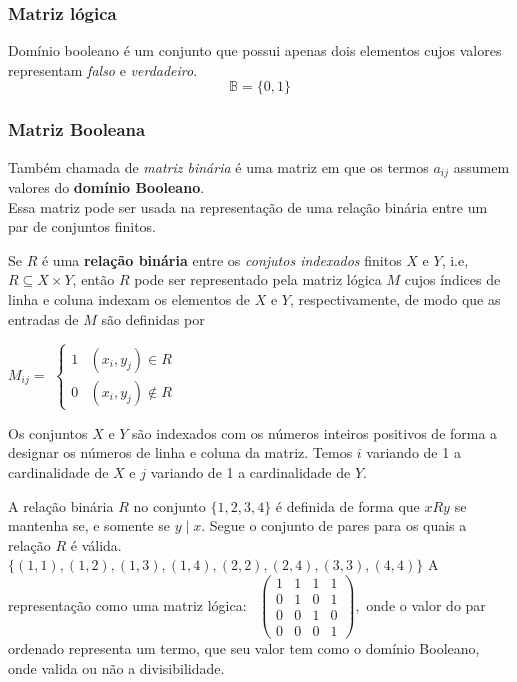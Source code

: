       \subsubsection{Matriz lógica}
         \begin{definition}
            Domínio booleano é um conjunto que possui apenas dois elementos cujos valores representam \textit{falso} e \textit{verdadeiro}.
            $$\mathbb{B} = \{0,1\}$$
         \end{definition}
      
      \subsubsection*{Matriz Booleana}
         Também chamada de \textit{matriz binária} é uma matriz em que os termos $a_{ij}$ assumem valores do \textbf{domínio Booleano}.\\
         Essa matriz pode ser usada na representação de uma relação binária entre um par de conjuntos finitos.
         \begin{definition}
            Se $R$ é uma \textbf{relação binária} entre os \textit{conjutos indexados} finitos $X$ e $Y$, i.e, $R \subseteq X \times Y$, então $R$ pode ser representado pela matriz lógica $M$ cujos índices de linha e coluna indexam os elementos de $X$ e $Y$, respectivamente, de modo que as entradas de $M$ são definidas por
            \begin{center}
               $M_{ij} = $
               $\begin{cases}
                  1 & (x_{i}, y_{j}) \in R \\ 
                  0 & (x_{i}, y_{j}) \notin R
               \end{cases}$
            \end{center}
            Os conjuntos $X$ e $Y$ são indexados com os números inteiros positivos de forma a designar os números de linha e coluna da matriz. Temos $i$ variando de 1 a cardinalidade de $X$ e $j$ variando de 1 a cardinalidade de $Y$.
         \end{definition}
         \begin{exmp}
            A relação binária $R$ no conjunto $\{1,2,3,4\}$ é definida de forma que $xRy$ se mantenha se, e somente se $y \mid x$. Segue o conjunto de pares para os quais a relação $R$ é válida.
            $\{(1,1),(1,2),(1,3),(1,4),(2,2),(2,4),(3,3),(4,4)\}$
            A representação como uma matriz lógica: \ 
            $\begin{pmatrix}
               1 & 1 & 1 & 1 \\
               0 & 1 & 0 & 1 \\
               0 & 0 & 1 & 0 \\
               0 & 0 & 0 & 1
            \end{pmatrix},$ 
            onde o valor do par ordenado representa um termo, que seu valor tem como o domínio Booleano, onde valida ou não a divisibilidade.
         \end{exmp}
